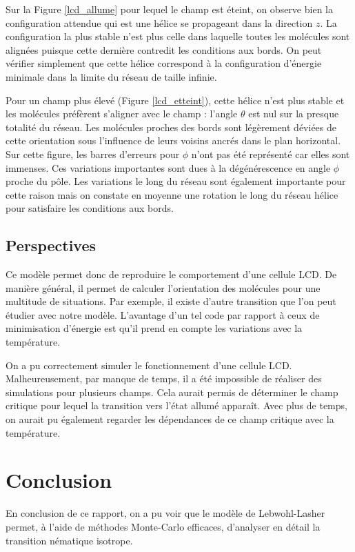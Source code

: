\documentclass[11pt,a4paper]{article}
\numberwithin{equation}{section}
\begin{document}
Sur la Figure \ref{lcd_allume} pour lequel le champ est éteint, on observe bien la configuration attendue qui est une hélice se propageant dans la direction $z$. 
La configuration la plus stable n'est plus celle dans laquelle toutes les molécules sont alignées puisque cette dernière contredit les conditions aux bords. On peut vérifier simplement que cette hélice correspond à la configuration d'énergie minimale dans la limite du réseau de taille infinie. 
\medskip

Pour un champ plus élevé (Figure \ref{lcd_etteint}), cette hélice n'est plus stable et les molécules préfèrent s'aligner avec le champ : l'angle $\theta$ est nul sur la presque totalité du réseau. Les molécules proches des bords sont légèrement déviées de cette orientation sous l'influence de leurs voisins ancrés dans le plan horizontal. Sur cette figure, les barres d'erreurs pour $\phi$ n'ont pas été représenté car elles sont immenses. Ces variations importantes sont dues à la dégénérescence en angle $\phi$ proche du pôle. Les variations le long du réseau sont  également importante pour cette raison mais on constate en moyenne une rotation le long du réseau hélice pour satisfaire les conditions aux bords. 

\subsection{Perspectives}
Ce modèle permet donc de reproduire le comportement d'une cellule LCD. De manière général, il permet de calculer l'orientation des molécules pour une multitude de situations. Par exemple, il existe d'autre transition que l'on peut étudier avec notre modèle. L'avantage d'un tel code par rapport à ceux de minimisation d'énergie est qu'il prend en compte les variations avec la température. 
\medskip

On a pu correctement simuler le fonctionnement d'une cellule LCD. Malheureusement, par manque de temps, il a été impossible de réaliser des simulations pour plusieurs champs. Cela aurait permis de déterminer le champ critique pour lequel la transition vers l'état allumé apparaît. Avec plus de temps, on aurait pu également regarder les dépendances de ce champ critique avec la température.


\section*{Conclusion}
En conclusion de ce rapport, on a pu voir que le modèle de Lebwohl-Lasher permet, à l'aide de méthodes Monte-Carlo efficaces, d'analyser en détail la transition nématique isotrope. 
\medskip
\end{document}

